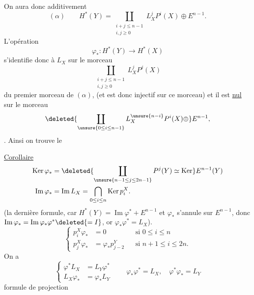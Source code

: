 On aura donc additivement
\[
(\alpha)\qquad H^*(Y)=\coprod_{\substack{i+j\leq n-1\\i,j\geq0}}L_X^jP^i(X)\oplus E^{n-1}.
\]
L'opération
\[\varphi_*:H^*(Y)\longrightarrow H^*(X)\]
s'identifie donc à $L_X$ sur le morceau
\[\coprod_{\substack{i+j\leq n-1\\i,j\geq0}}L_X^jP^j(X)\]
du premier morceau de $(\alpha)$, (et est  donc injectif sur ce morceau) et il est \uline{nul} sur le morceau
\[
\deleted{\coprod_{\unsure{0\leq i\leq n-1}}L_X^{\unsure{n-i}}P^i(X)\oplus}E^{n-1},
\]
. Ainsi on trouve le

\uline{Corollaire}
\[
\begin{aligned}
\operatorname{Ker}\varphi_*&=\deleted{\coprod_{\unsure{n-1\leq j\leq2n-1}}P^j(Y)\simeq\operatorname{Ker}}E^{n-1}(Y)\\
\operatorname{Im}\varphi_*&=\operatorname{Im}L_X=\bigcap_{0\leq i\leq n}\operatorname{Ker}p_i^X.
\end{aligned}
\]
(la dernière formule, car $H^*(Y)=\operatorname{Im}\varphi^*+E^{n-1}$ et $\varphi_*$ s'annule sur $E^{n-1}$, donc $\operatorname{Im}\varphi_*=\operatorname{Im}\varphi_*\varphi^*\deleted{=I}$, or $\varphi_*\varphi^*=L_X$).
\[
\left\{\begin{aligned}
p_i^X\varphi_*&=0 &&\text{si }0\leq i\leq n\\
p_{j}^X\varphi_*&=\varphi_*p_{j-2}^Y &&\text{si }n+1\leq i\leq2n.
\end{aligned}\right.
\]
On a
\[
\left\{\begin{aligned}
\varphi^*L_X&=L_Y\varphi^*\\
L_X\varphi_*&=\varphi_*L_Y
\end{aligned}\right.
\qquad
\varphi_*\varphi^*=L_X,\quad\varphi^*\varphi_*=L_Y
\]
formule de projection

